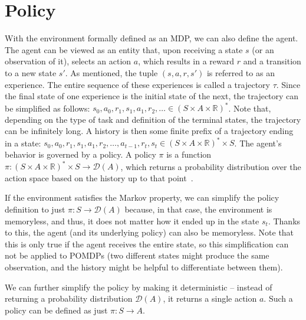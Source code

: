 \documentclass[
  digital,     %
  oneside,     %
  nosansbold,  %
  nocolorbold, %
  lof,         %
  lot,         %
]{fithesis4}
\begin{document}
\section{Policy}
With the environment formally defined as an MDP, we can also define the agent. The agent can be viewed as an entity that, upon receiving a state $s$ (or an observation of it), selects an action $a$, which results in a reward $r$ and a transition to a new state $s'$. As mentioned, the tuple $(s, a, r, s')$ is referred to as an experience. The entire sequence of these experiences is called a trajectory $\tau$. Since the final state of one experience is the initial state of the next, the trajectory can be simplified as follows: $s_0,a_0,r_1,s_1,a_1,r_2,\dotsc \in (S\times A \times \mathbb{R})^{*}$. Note that, depending on the type of task and definition of the terminal states, the trajectory can be infinitely long. A history is then some finite prefix of a trajectory ending in a state: $s_0,a_0,r_1,s_1,a_1,r_2,\dotsc, a_{t-1},r_t,s_t\in (S\times A \times \mathbb{R})^{*}\times S$.
The agent's behavior is governed by a policy. A policy $\pi$ is a function $\pi\colon (S\times A \times \mathbb{R})^{*}\times S \to \mathcal{D}(A)$, which returns a probability distribution over the action space based on the history up to that point~\cite[p. 19]{PA230}.

If the environment satisfies the Markov property, we can simplify the policy definition to just $\pi\colon S \to \mathcal{D}(A)$ because, in that case, the environment is memoryless, and thus, it does not matter how it ended up in the state $s_t$. Thanks to this, the agent (and its underlying policy) can also be memoryless. Note that this is only true if the agent receives the entire state, so this simplification can not be applied to POMDPs (two different states might produce the same observation, and the history might be helpful to differentiate between them).

We can further simplify the policy by making it deterministic -- instead of returning a probability distribution $\mathcal{D}(A)$, it returns a single action $a$. Such a policy can be defined as just $\pi\colon S\to A$.
\end{document}
